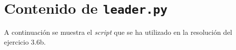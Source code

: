 \chapter{Contenido de \texttt{leader.py}}
A continuación se muestra el \textit{script} que se ha utilizado en la resolución del ejercicio 3.6b.



